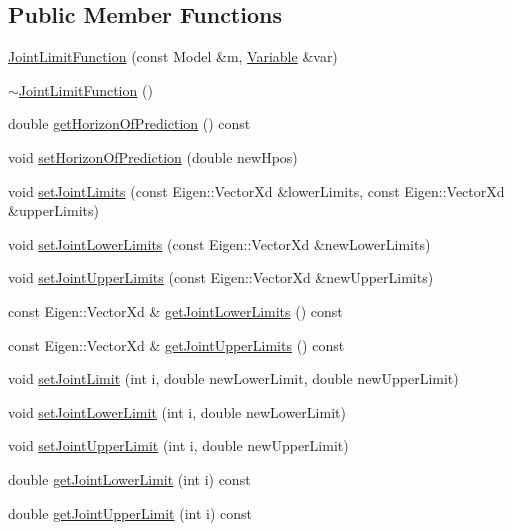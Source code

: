 \subsection*{Public Member Functions}
\begin{DoxyCompactItemize}
\item 
\hyperlink{classocra_1_1JointLimitFunction_a00952411e7a7906fc6e5aedcfcfc6bc3}{Joint\+Limit\+Function} (const Model \&m, \hyperlink{classocra_1_1Variable}{Variable} \&var)
\item 
\hyperlink{classocra_1_1JointLimitFunction_aa028e738a7dd0e89ef05628abf32d79f}{$\sim$\+Joint\+Limit\+Function} ()
\item 
double \hyperlink{classocra_1_1JointLimitFunction_ad7afccc24fc2bc685583bfd5032ca568}{get\+Horizon\+Of\+Prediction} () const
\item 
void \hyperlink{classocra_1_1JointLimitFunction_a02dfaf445e997387b2fd915bc398dc73}{set\+Horizon\+Of\+Prediction} (double new\+Hpos)
\item 
void \hyperlink{classocra_1_1JointLimitFunction_a9647e0888530d880ff412a057f83295d}{set\+Joint\+Limits} (const Eigen\+::\+Vector\+Xd \&lower\+Limits, const Eigen\+::\+Vector\+Xd \&upper\+Limits)
\item 
void \hyperlink{classocra_1_1JointLimitFunction_af08943f266069853dce1c491ef7f4e08}{set\+Joint\+Lower\+Limits} (const Eigen\+::\+Vector\+Xd \&new\+Lower\+Limits)
\item 
void \hyperlink{classocra_1_1JointLimitFunction_a661a85585b10ec71cbbbe6cb12523507}{set\+Joint\+Upper\+Limits} (const Eigen\+::\+Vector\+Xd \&new\+Upper\+Limits)
\item 
const Eigen\+::\+Vector\+Xd \& \hyperlink{classocra_1_1JointLimitFunction_ae9a3d083f00c608ed09a687447d086f1}{get\+Joint\+Lower\+Limits} () const
\item 
const Eigen\+::\+Vector\+Xd \& \hyperlink{classocra_1_1JointLimitFunction_aeed410787750256bdd52fdd5ca3c519f}{get\+Joint\+Upper\+Limits} () const
\item 
void \hyperlink{classocra_1_1JointLimitFunction_a41432c4d8d08c17e90892a26963d3d5e}{set\+Joint\+Limit} (int i, double new\+Lower\+Limit, double new\+Upper\+Limit)
\item 
void \hyperlink{classocra_1_1JointLimitFunction_a490c1e19dd3897097a61d616a3e1709d}{set\+Joint\+Lower\+Limit} (int i, double new\+Lower\+Limit)
\item 
void \hyperlink{classocra_1_1JointLimitFunction_a0f83df6fab80175c07070c00d26a41b5}{set\+Joint\+Upper\+Limit} (int i, double new\+Upper\+Limit)
\item 
double \hyperlink{classocra_1_1JointLimitFunction_aa5ad56143f8d257e89b308cabb5fd560}{get\+Joint\+Lower\+Limit} (int i) const
\item 
double \hyperlink{classocra_1_1JointLimitFunction_ae39c838b6618f3d1dded5aad16751e60}{get\+Joint\+Upper\+Limit} (int i) const
\end{DoxyCompactItemize}
